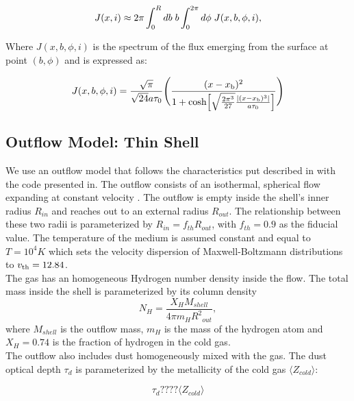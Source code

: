 \documentclass{latex/emulateapj}
\begin{document}
\begin{equation}
J(x,i) \approx 2\pi \int_0^Rdb \hs b
\int_0^{2\pi}d\phi \hs J(x,b,\phi,i),
\end{equation}

Where $J(x, b, \phi, i)$ is the spectrum of the flux emerging from the surface at point $(b, \phi)$ and is expressed as: 

\begin{equation}
J(x,b,\phi,i)=\frac{\sqrt{\pi}}{\sqrt{24}a\tau_0}\Bigg{(}\frac{(x-x_{\rm
    b})^2}{1+{\rm cosh}\Big{[}\sqrt{\frac{2\pi^3}{27}}\frac{|(x-x_{\rm
        b})^3|}{a\tau_0}\Big{]}}\Bigg{)} 
\end{equation}


\subsection{Outflow Model: Thin Shell}

We use an outflow model that follows the characteristics put described in \citep{Verhamme06} with the code presented in\citep{Orsi12}.  The outflow consists of an isothermal, spherical flow expanding at
constant velocity \vel.  The outflow is empty inside the shell's inner radius $R_{in}$ and reaches out to an external radius $R_{out}$. The relationship between these two radii is parameterized by $R_{in} =
f_{th}R_{out}$, with $f_{th}=0.9$ as the fiducial value. The temperature of the medium is assumed constant and equal to $T=10^4 K$ which sets the velocity dispersion of Maxwell-Boltzmann distributions to $v_{\rm th}=12.84$\kms. \\

The gas has an homogeneous Hydrogen number density inside the flow. The total mass inside the shell is parameterized by its column density\\

\begin{equation}
\label{eq:nh}
N_H = \frac{X_H M_{shell}}{4\pi m_H {R^2}_{out}},
\end{equation}
%
where $M_{shell}$ is the outflow mass, $m_H$ is the mass of the hydrogen atom and $X_H=0.74$ is the fraction of hydrogen in the cold gas.\\

The outflow also includes dust homogeneously mixed with the gas. The dust optical depth $\tau_d$ is parameterized by the metallicity of the cold gas $\langle Z_{cold} \rangle$: 

\begin{equation}
\label{eq:z}
\tau_{d} ???? \langle Z_{cold} \rangle
\end{equation}
\end{document}
